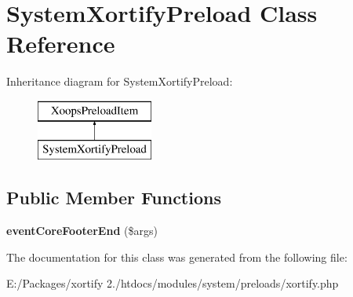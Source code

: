 \hypertarget{class_system_xortify_preload}{\section{System\-Xortify\-Preload Class Reference}
\label{class_system_xortify_preload}
}
Inheritance diagram for System\-Xortify\-Preload\-:\begin{figure}[H]
\begin{center}
\leavevmode
\includegraphics[height=2.000000cm]{class_system_xortify_preload}
\end{center}
\end{figure}
\subsection*{Public Member Functions}
\begin{DoxyCompactItemize}
\item 
\hypertarget{class_system_xortify_preload_ab6ecc671248b7ce7ae612524ff5cf752}{{\bfseries event\-Core\-Footer\-End} (\$args)}\label{class_system_xortify_preload_ab6ecc671248b7ce7ae612524ff5cf752}

\end{DoxyCompactItemize}


The documentation for this class was generated from the following file\-:\begin{DoxyCompactItemize}
\item 
E\-:/\-Packages/xortify 2./htdocs/modules/system/preloads/xortify.\-php\end{DoxyCompactItemize}
